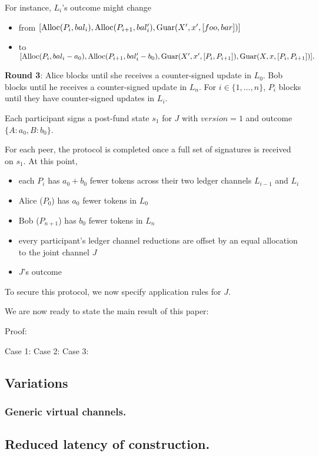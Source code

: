 For instance, $L_i$'s outcome might change
\begin{itemize}
    \item from $[\mbox{Alloc}(P_i, bal_i), \mbox{Alloc}(P_{i+1}, bal_i'), \mbox{Guar}(X', x', [foo, bar])]$
    \item to
$[\mbox{Alloc}(P_i, bal_i - a_0), \mbox{Alloc}(P_{i+1}, bal_i' - b_0), \mbox{Guar}(X', x', [P_i, P_{i+1}]), \mbox{Guar}(X, x, [P_i, P_{i+1}])].$
\end{itemize}


\textbf{Round 3}:
Alice blocks until she receives a counter-signed update in $L_0$. Bob blocks until he receives a counter-signed update in $L_n$. For $i \in \{1,\ldots,n\}$, $P_i$ blocks until they have counter-signed updates in $L_i$.

Each participant signs a post-fund state $s_1$ for $J$ with $version = 1$ and outcome $\{A: a_0, B: b_0\}$.

For each peer, the protocol is completed once a full set of signatures is received on $s_1$. At this point,
\begin{itemize}
    \item each $P_i$ has $a_0 + b_0$ fewer tokens across their two ledger channels $L_{i-1}$ and $L_i$
    \item Alice ($P_0$) has $a_0$ fewer tokens in $L_0$
    \item Bob ($P_{n+1}$) has $b_0$ fewer tokens in $L_{n}$
    \item every participant's ledger channel reductions are offset by an equal allocation to the joint channel $J$
    \item $J$'s outcome
\end{itemize}

To secure this protocol, we now specify application rules for $J$. 

We are now ready to state the main result of this paper:

Proof: 

Case 1:
Case 2:
Case 3:


\subsection{Variations}

\subsubsection{Generic virtual channels.}

\subsection{Reduced latency of construction.}
\todo{}
